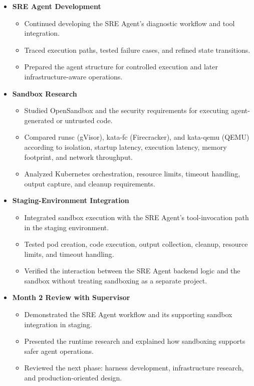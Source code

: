 \begin{itemize}
    \item \textbf{SRE Agent Development}
    \begin{itemize}
        \item Continued developing the SRE Agent's diagnostic workflow and tool integration.
        \item Traced execution paths, tested failure cases, and refined state transitions.
        \item Prepared the agent structure for controlled execution and later infrastructure-aware operations.
    \end{itemize}

    \item \textbf{Sandbox Research}
    \begin{itemize}
        \item Studied OpenSandbox and the security requirements for executing agent-generated or untrusted code.
        \item Compared runsc (gVisor), kata-fc (Firecracker), and kata-qemu (QEMU) according to isolation, startup latency, execution latency, memory footprint, and network throughput.
        \item Analyzed Kubernetes orchestration, resource limits, timeout handling, output capture, and cleanup requirements.
    \end{itemize}

    \item \textbf{Staging-Environment Integration}
    \begin{itemize}
        \item Integrated sandbox execution with the SRE Agent's tool-invocation path in the staging environment.
        \item Tested pod creation, code execution, output collection, cleanup, resource limits, and timeout handling.
        \item Verified the interaction between the SRE Agent backend logic and the sandbox without treating sandboxing as a separate project.
    \end{itemize}

    \item \textbf{Month 2 Review with Supervisor}
    \begin{itemize}
        \item Demonstrated the SRE Agent workflow and its supporting sandbox integration in staging.
        \item Presented the runtime research and explained how sandboxing supports safer agent operations.
        \item Reviewed the next phase: harness development, infrastructure research, and production-oriented design.
    \end{itemize}
\end{itemize}

